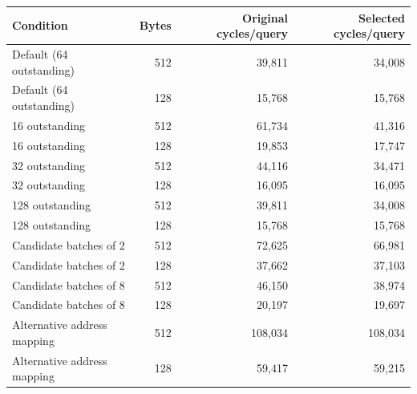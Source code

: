 \begin{tabular}{lrrr}
\toprule
Condition & Bytes & Original cycles/query & Selected cycles/query \\
\midrule
Default (64 outstanding) & 512 & 39,811 & 34,008 \\
Default (64 outstanding) & 128 & 15,768 & 15,768 \\
16 outstanding & 512 & 61,734 & 41,316 \\
16 outstanding & 128 & 19,853 & 17,747 \\
32 outstanding & 512 & 44,116 & 34,471 \\
32 outstanding & 128 & 16,095 & 16,095 \\
128 outstanding & 512 & 39,811 & 34,008 \\
128 outstanding & 128 & 15,768 & 15,768 \\
Candidate batches of 2 & 512 & 72,625 & 66,981 \\
Candidate batches of 2 & 128 & 37,662 & 37,103 \\
Candidate batches of 8 & 512 & 46,150 & 38,974 \\
Candidate batches of 8 & 128 & 20,197 & 19,697 \\
Alternative address mapping & 512 & 108,034 & 108,034 \\
Alternative address mapping & 128 & 59,417 & 59,215 \\
\bottomrule
\end{tabular}
